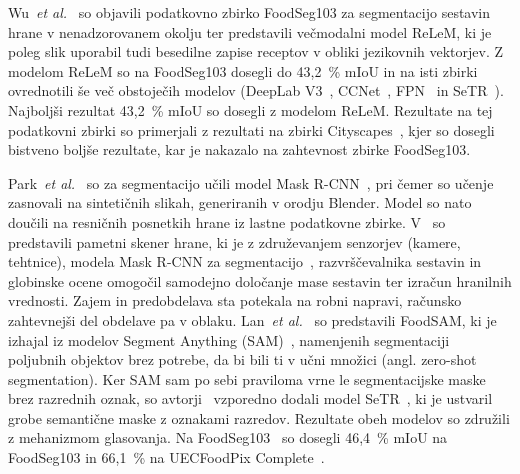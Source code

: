 \documentclass[a4paper,twoside,openright,12pt,slovene]{book}
\newcommand{\etal}{\textit{et al.}} %
\begin{document}
            Wu~\etal~\cite{src:wu2021large} so objavili podatkovno zbirko
            FoodSeg103 za segmentacijo sestavin hrane v nenadzorovanem okolju
            ter predstavili večmodalni model ReLeM, ki je poleg slik uporabil
            tudi besedilne zapise receptov v obliki jezikovnih vektorjev. Z modelom ReLeM so na
            FoodSeg103 dosegli do 43{,}2~\% mIoU in na isti zbirki ovrednotili
            še več obstoječih modelov (DeepLab V3~\cite{src:chen2017deeplab},
            CCNet~\cite{src:huang2019ccnet},
            FPN~\cite{src:kirillov2019panoptic} in
            SeTR~\cite{src:zheng2021rethinking}). Najboljši rezultat 43{,}2~\%
            mIoU so dosegli z modelom ReLeM. Rezultate na tej podatkovni
            zbirki so primerjali z rezultati na zbirki
            Cityscapes~\cite{src:cordts2016cityscapes}, kjer so dosegli
            bistveno boljše rezultate, kar je nakazalo na zahtevnost zbirke
            FoodSeg103.

            Park~\etal~\cite{src:park2021deep} so za segmentacijo učili model
            Mask R-CNN~\cite{src:he2017mask}, pri čemer so učenje zasnovali na
            sintetičnih slikah, generiranih v orodju Blender. Model so nato
            doučili na resničnih posnetkih hrane iz lastne podatkovne zbirke.
            V~\cite{src:javadi2024smart} so predstavili pametni skener hrane,
            ki je z združevanjem senzorjev (kamere, tehtnice), modela Mask
            R-CNN za segmentacijo~\cite{src:he2017mask}, razvrščevalnika
            sestavin in globinske ocene omogočil samodejno določanje mase
            sestavin ter izračun hranilnih vrednosti. Zajem in predobdelava sta
            potekala na robni napravi, računsko zahtevnejši del obdelave pa v
            oblaku.
            Lan~\etal~\cite{src:lan2023foodsam} so predstavili FoodSAM, ki je
            izhajal iz modelov Segment Anything
            (SAM)~\cite{src:kirillov2023segment}, namenjenih segmentaciji
            poljubnih objektov brez potrebe, da bi bili ti v učni množici
            (angl. zero-shot segmentation). Ker SAM sam po sebi praviloma vrne
            le segmentacijske maske brez razrednih oznak, so
            avtorji~\cite{src:lan2023foodsam} vzporedno dodali model
            SeTR~\cite{src:zheng2021rethinking}, ki je ustvaril grobe
            semantične maske z oznakami razredov. Rezultate obeh modelov so
            združili z mehanizmom glasovanja. Na
            FoodSeg103~\cite{src:wu2021large} so dosegli 46{,}4~\% mIoU na
            FoodSeg103 in 66{,}1~\% na UECFoodPix
            Complete~\cite{src:okamoto2021uec}.
\end{document}
